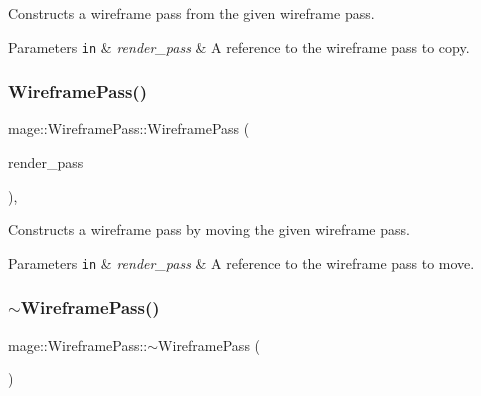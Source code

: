 Constructs a wireframe pass from the given wireframe pass.


\begin{DoxyParams}[1]{Parameters}
\mbox{\tt in}  & {\em render\+\_\+pass} & A reference to the wireframe pass to copy. \\
\hline
\end{DoxyParams}
\hypertarget{classmage_1_1_wireframe_pass_ad6740862dc463125ba93317d0e640848}{}\label{classmage_1_1_wireframe_pass_ad6740862dc463125ba93317d0e640848} 
\subsubsection{\texorpdfstring{Wireframe\+Pass()}{WireframePass()}\hspace{0.1cm}{\footnotesize\ttfamily [3/3]}}
{\footnotesize\ttfamily mage\+::\+Wireframe\+Pass\+::\+Wireframe\+Pass (\begin{DoxyParamCaption}\item[{\hyperlink{classmage_1_1_wireframe_pass}{Wireframe\+Pass} \&\&}]{render\+\_\+pass }\end{DoxyParamCaption})\hspace{0.3cm}{\ttfamily [default]}, {\ttfamily [noexcept]}}

Constructs a wireframe pass by moving the given wireframe pass.


\begin{DoxyParams}[1]{Parameters}
\mbox{\tt in}  & {\em render\+\_\+pass} & A reference to the wireframe pass to move. \\
\hline
\end{DoxyParams}
\hypertarget{classmage_1_1_wireframe_pass_a186e4dd37ac17382872180385ec4dca1}{}\label{classmage_1_1_wireframe_pass_a186e4dd37ac17382872180385ec4dca1} 
\subsubsection{\texorpdfstring{$\sim$\+Wireframe\+Pass()}{~WireframePass()}}
{\footnotesize\ttfamily mage\+::\+Wireframe\+Pass\+::$\sim$\+Wireframe\+Pass (\begin{DoxyParamCaption}{ }\end{DoxyParamCaption})\hspace{0.3cm}{\ttfamily [default]}}

